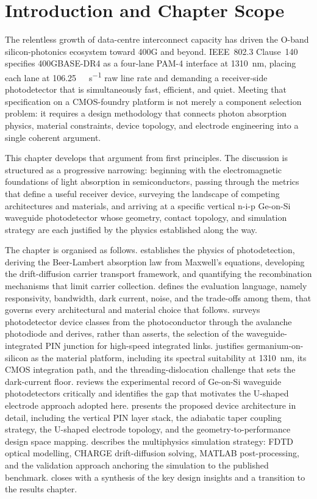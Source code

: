 \section[Introduction]{Introduction and Chapter Scope}
\label{sec:pd_intro}

The relentless growth of data-centre interconnect capacity has driven the O-band
silicon-photonics ecosystem toward 400G and beyond. IEEE~802.3 Clause~140
specifies 400GBASE-DR4 as a four-lane PAM-4 interface at \SI{1310}{\nano\metre},
placing each lane at \SI{106.25}{\giga\bit\per\second} raw line rate and demanding
a receiver-side photodetector that is simultaneously fast, efficient, and quiet.
Meeting that specification on a CMOS-foundry platform is not merely a component
selection problem: it requires a design methodology that connects photon absorption
physics, material constraints, device topology, and electrode engineering into a
single coherent argument.

This chapter develops that argument from first principles. The discussion is
structured as a progressive narrowing: beginning with the electromagnetic
foundations of light absorption in semiconductors, passing through the metrics
that define a useful receiver device, surveying the landscape of competing
architectures and materials, and arriving at a specific vertical n-i-p
Ge-on-Si waveguide photodetector whose geometry, contact topology, and
simulation strategy are each justified by the physics established along the way.

The chapter is organised as follows.
 establishes the physics of photodetection, deriving
the Beer-Lambert absorption law from Maxwell's equations, developing the
drift-diffusion carrier transport framework, and quantifying the recombination
mechanisms that limit carrier collection.
 defines the evaluation language, namely responsivity,
bandwidth, dark current, noise, and the trade-offs among them, that governs
every architectural and material choice that follows.
 surveys photodetector device classes from the
photoconductor through the avalanche photodiode and derives, rather than
asserts, the selection of the waveguide-integrated PIN junction for high-speed
integrated links.
 justifies germanium-on-silicon as the material platform,
including its spectral suitability at \SI{1310}{\nano\metre}, its CMOS integration
path, and the threading-dislocation challenge that sets the dark-current floor.
 reviews the experimental record of Ge-on-Si waveguide
photodetectors critically and identifies the gap that motivates the U-shaped
electrode approach adopted here.
 presents the proposed device architecture in detail,
including the vertical PIN layer stack, the adiabatic taper coupling strategy,
the U-shaped electrode topology, and the geometry-to-performance design space
mapping.
 describes the multiphysics simulation strategy: FDTD
optical modelling, CHARGE drift-diffusion solving, MATLAB post-processing, and
the validation approach anchoring the simulation to the published benchmark.
 closes with a synthesis of the key design insights and a
transition to the results chapter.
